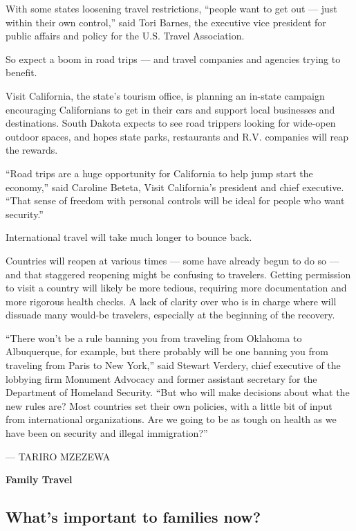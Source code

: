 With some states loosening travel restrictions, ``people want to get out
--- just within their own control,'' said Tori Barnes, the executive
vice president for public affairs and policy for the U.S. Travel
Association.

So expect a boom in road trips --- and travel companies and agencies
trying to benefit.

Visit California, the state's tourism office, is planning an in-state
campaign encouraging Californians to get in their cars and support local
businesses and destinations. South Dakota expects to see road trippers
looking for wide-open outdoor spaces, and hopes state parks, restaurants
and R.V. companies will reap the rewards.

``Road trips are a huge opportunity for California to help jump start
the economy,'' said Caroline Beteta, Visit California's president and
chief executive. ``That sense of freedom with personal controls will be
ideal for people who want security.''

International travel will take much longer to bounce back.

Countries will reopen at various times --- some have already begun to do
so --- and that staggered reopening might be confusing to travelers.
Getting permission to visit a country will likely be more tedious,
requiring more documentation and more rigorous health checks. A lack of
clarity over who is in charge where will dissuade many would-be
travelers, especially at the beginning of the recovery.

``There won't be a rule banning you from traveling from Oklahoma to
Albuquerque, for example, but there probably will be one banning you
from traveling from Paris to New York,'' said Stewart Verdery, chief
executive of the lobbying firm Monument Advocacy and former assistant
secretary for the Department of Homeland Security. ``But who will make
decisions about what the new rules are? Most countries set their own
policies, with a little bit of input from international organizations.
Are we going to be as tough on health as we have been on security and
illegal immigration?''

--- TARIRO MZEZEWA

\textbf{Family Travel}

\hypertarget{whats-important-to-families-now}{%
\subsection{What's important to families
now?}\label{whats-important-to-families-now}}

